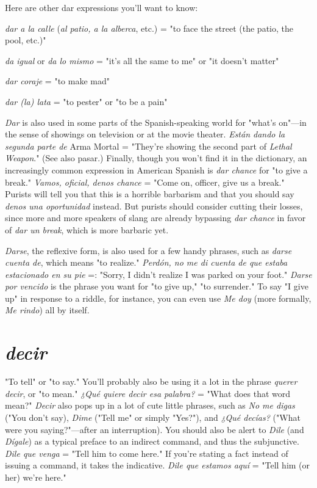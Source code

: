 \documentclass[14pt,a4paper,oneside]{memoir}
\newcommand{\bsk}{\vspace{20pt}}
\newcommand{\indu}{\hspace{20pt}}
\begin{document}
Here are other dar expressions you'll want to know:

\bsk

\indu \emph{dar a la calle} (\emph{al patio, a la alberca}, etc.) = "to face the street
(the patio, the pool, etc.)"

\indu \emph{da igual} or \emph{da lo mismo} = "it's all the same to me" or "it
doesn't matter"

\indu \emph{dar coraje} = "to make mad"

\indu \emph{dar (la) lata} = "to pester" or "to be a pain"

\bsk

\emph{Dar} is also used in some parts of the Spanish-speaking world for
"what's on"---in the sense of showings on television or at the movie
theater. \emph{Están dando la segunda parte de} Arma Mortal = "They're
showing the second part of \emph{Lethal Weapon}." (See also pasar.) Finally,
though you won't find it in the dictionary, an increasingly common expression in American Spanish is \emph{dar chance} for "to give a break." \emph{Vamos, oficial, denos chance} = "Come on, officer, give us a break." Purists will tell you that this is a horrible barbarism and that you should
say \emph{denos una oportunidad} instead. But purists should consider cutting their losses, since more and more speakers of slang are already bypassing \emph{dar chance} in favor of \emph{dar un break}, which is more barbaric yet.

\emph{Darse}, the reflexive form, is also used for a few handy phrases,
such as \emph{darse cuenta de}, which means "to realize." \emph{Perdón, no me di
	cuenta de que estaba estacionado en su pie} =: "Sorry, I didn't realize
I was parked on your foot." \emph{Darse por vencido} is the phrase you want
for "to give up," "to surrender." To say "I give up" in response to a
riddle, for instance, you can even use \emph{Me doy} (more formally, \emph{Me rindo}) all by itself.

\section{\emph{decir}}

"To tell" or "to say." You'll probably also be using it a lot in
the phrase \emph{querer decir}, or "to mean." \emph{¿Qué quiere decir esa palabra?}
= "What does that word mean?" \emph{Decir} also pops up in a lot of cute
little phrases, such as \emph{No me digas} ("You don't say), \emph{Dime} ("Tell me"
or simply "Yes?"), and \emph{¿Qué decías?} ("What were you saying?"---after
an interruption). You should also be alert to \emph{Dile} (and \emph{Dígale}) as a typical preface to an indirect command, and thus the subjunctive. \emph{Dile que
	venga} = "Tell him to come here." If you're stating a fact instead of
issuing a command, it takes the indicative. \emph{Dile que estamos aquí} =
"Tell him (or her) we're here."
\end{document}
